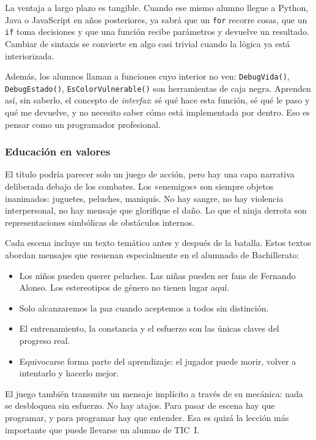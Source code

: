\documentclass[a4paper,12pt]{article}
\begin{document}
La ventaja a largo plazo es tangible. Cuando ese mismo alumno llegue a Python, Java o JavaScript
en años posteriores, ya sabrá que un \texttt{for} recorre cosas, que un \texttt{if} toma
decisiones y que una función recibe parámetros y devuelve un resultado. Cambiar de sintaxis se
convierte en algo casi trivial cuando la lógica ya está interiorizada.

Además, los alumnos llaman a funciones cuyo interior no ven: \texttt{DebugVida()},
\texttt{DebugEstado()}, \texttt{EsColorVulnerable()} son herramientas de caja negra. Aprenden
así, sin saberlo, el concepto de \emph{interfaz}: sé qué hace esta función, sé qué le paso y
qué me devuelve, y no necesito saber cómo está implementada por dentro. Eso es pensar como
un programador profesional.

\subsubsection{Educación en valores}
\label{sec:valores}

El título podría parecer solo un juego de acción, pero hay una capa narrativa deliberada debajo
de los combates. Los «enemigos» son siempre objetos inanimados: juguetes, peluches, maniquís.
No hay sangre, no hay violencia interpersonal, no hay mensaje que glorifique el daño. Lo que el
ninja derrota son representaciones simbólicas de obstáculos internos.

Cada escena incluye un texto temático antes y después de la batalla. Estos textos abordan mensajes
que resuenan especialmente en el alumnado de Bachillerato:

\begin{itemize}
  \item Los niños pueden querer peluches. Las niñas pueden ser fans de Fernando Alonso.
        Los estereotipos de género no tienen lugar aquí.
  \item Solo alcanzaremos la paz cuando aceptemos a todos sin distinción.
  \item El entrenamiento, la constancia y el esfuerzo son las únicas claves del progreso real.
  \item Equivocarse forma parte del aprendizaje: el jugador puede morir, volver a intentarlo
        y hacerlo mejor.
\end{itemize}

El juego también transmite un mensaje implícito a través de su mecánica: nada se desbloquea
sin esfuerzo. No hay atajos. Para pasar de escena hay que programar, y para programar hay que
entender. Esa es quizá la lección más importante que puede llevarse un alumno de TIC~I.
\end{document}
